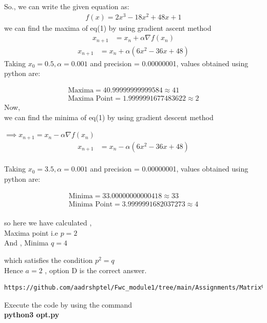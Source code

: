 \documentclass[journal,12pt,twocolumn]{IEEEtran}
\begin{document}
So., we can write the given equation as: 
\begin{align}
 f(x) = 2x^3 -18x^2+ 48x+1
\end{align} 
we can find the maxima of eq(1) by using gradient ascent method
	\begin{align}
	 x_{n+1} &= x_n + \alpha \nabla f(x_n) 
	\end{align}
	\begin{align}
	 x_{n+1} &= x_n + \alpha (6x^2 - 36x + 48)
	\end{align}
Taking $x_0=0.5,\alpha=0.001$ and precision = 0.00000001, values obtained using python are:
    
    \begin{align}
        \boxed{\text{Maxima} = 40.99999999999584 \approx 41}\\
        \boxed{\text{Maxima Point} =1.9999991677483622 \approx 2}
    \end{align}
  Now,\\ 
   we can find the minima of eq(1) by using gradient descent method
 
$\implies x_{n+1} = x_n - \alpha \nabla f(x_n) $\\
 \begin{align}
  x_{n+1} &= x_n - \alpha (6x^2 - 36x + 48)
    \end{align}\\
Taking $x_0=3.5,\alpha=0.001$ and precision = 0.00000001, values obtained using python are:
    
    \begin{align}
        \boxed{\text{Minima} =33.00000000000418 \approx 33}\\
        \boxed{\text{Minima Point} = 3.9999991682037273 \approx 4}
    \end{align}
\\
so here we have calculated ,\\
Maxima point i.e $p = 2$\\
And , Minima $q =4$

which satisfies the condition $p^2 = q$
\\
Hence $a=2$ , option D is the correct answer. \\
\begin{lstlisting}
https://github.com/aadrshptel/Fwc_module1/tree/main/Assignments/Matrix%20assignments/Optimisation/codes
\end{lstlisting}
Execute the code by using the command\\
\textbf{python3 opt.py}
\end{document}
